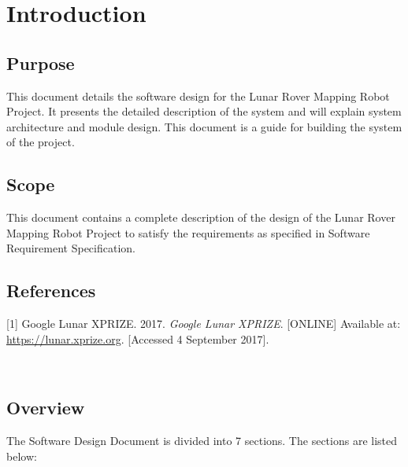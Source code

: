 \documentclass[12pt,a4paper]{article}
\begin{document}
    \vspace{50px}
    \listoffigures

	\newpage
	

\section{Introduction}

\subsection{Purpose}
This document details the software design for the Lunar Rover Mapping Robot Project. It presents the detailed description of the system and will explain system architecture and module design. This document is a guide for building the system of the project.
\subsection{Scope}
This document contains a complete description of the design of the Lunar Rover Mapping Robot Project to satisfy the requirements as specified in Software Requirement Specification. 
\subsection{References}
    \hypertarget{googlelunarxprize}{[1] Google Lunar XPRIZE. 2017. \emph{Google Lunar XPRIZE}. [ONLINE] Available at: \url{https://lunar.xprize.org}. [Accessed 4 September 2017].}\\
\subsection{Overview}
The Software Design Document is divided into 7 sections.  The sections are listed below:
\end{document}
